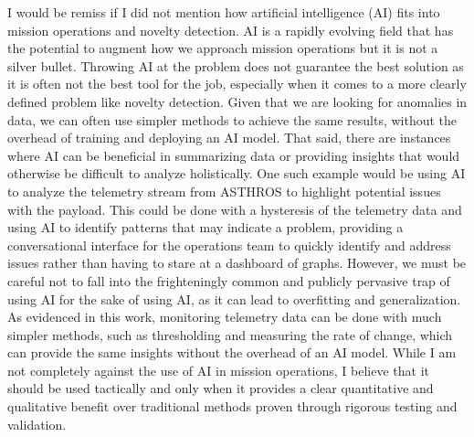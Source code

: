 I would be remiss if I did not mention how artificial intelligence (AI) fits into mission operations and novelty detection.
AI is a rapidly evolving field that has the potential to augment how we approach mission operations but it is not a silver bullet.
Throwing AI at the problem does not guarantee the best solution as it is often not the best tool for the job, especially when it comes to a more clearly defined problem like novelty detection.
Given that we are looking for anomalies in data, we can often use simpler methods to achieve the same results, without the overhead of training and deploying an AI model.
That said, there are instances where AI can be beneficial in summarizing data or providing insights that would otherwise be difficult to analyze holistically.
One such example would be using AI to analyze the telemetry stream from ASTHROS to highlight potential issues with the payload.
This could be done with a hysteresis of the telemetry data and using AI to identify patterns that may indicate a problem, providing a conversational interface for the operations team to quickly identify and address issues rather than having to stare at a dashboard of graphs.
However, we must be careful not to fall into the frighteningly common and publicly pervasive trap of using AI for the sake of using AI, as it can lead to overfitting and generalization.
As evidenced in this work, monitoring telemetry data can be done with much simpler methods, such as thresholding and measuring the rate of change, which can provide the same insights without the overhead of an AI model.
While I am not completely against the use of AI in mission operations, I believe that it should be used tactically and only when it provides a clear quantitative and qualitative benefit over traditional methods proven through rigorous testing and validation.


